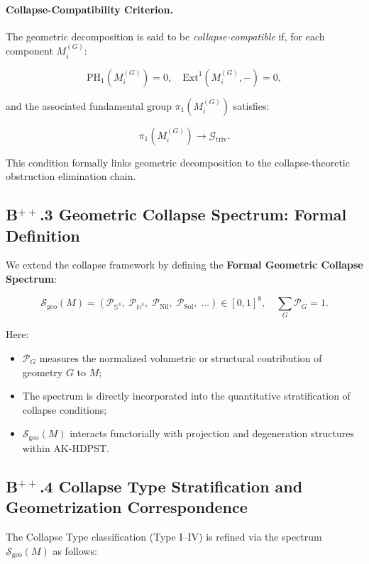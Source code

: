 \documentclass[11pt]{article}
\begin{document}
\paragraph{Collapse-Compatibility Criterion.}  
The geometric decomposition is said to be \emph{collapse-compatible} if, for each component $M_i^{(G)}$:

\[
\mathrm{PH}_1(M_i^{(G)}) = 0,\quad \mathrm{Ext}^1(M_i^{(G)}, -) = 0,
\]

and the associated fundamental group $\pi_1(M_i^{(G)})$ satisfies:

\[
\pi_1(M_i^{(G)}) \longrightarrow \mathcal{G}_{\mathrm{triv}}.
\]

This condition formally links geometric decomposition to the collapse-theoretic obstruction elimination chain.

\subsection*{B$^{++}$.3 Geometric Collapse Spectrum: Formal Definition}

We extend the collapse framework by defining the \textbf{Formal Geometric Collapse Spectrum}:

\[
\mathcal{S}_{\mathrm{geo}}(M) = \left( \mathcal{P}_{\mathbb{S}^3},\; \mathcal{P}_{\mathbb{H}^3},\; \mathcal{P}_{\mathrm{Nil}},\; \mathcal{P}_{\mathrm{Sol}},\; \ldots \right) \in [0,1]^8,\quad \sum_G \mathcal{P}_G = 1.
\]

Here:

\begin{itemize}
    \item $\mathcal{P}_G$ measures the normalized volumetric or structural contribution of geometry $G$ to $M$;
    \item The spectrum is directly incorporated into the quantitative stratification of collapse conditions;
    \item $\mathcal{S}_{\mathrm{geo}}(M)$ interacts functorially with projection and degeneration structures within AK-HDPST.
\end{itemize}

\subsection*{B$^{++}$.4 Collapse Type Stratification and Geometrization Correspondence}

The Collapse Type classification (Type I–IV) is refined via the spectrum $\mathcal{S}_{\mathrm{geo}}(M)$ as follows:
\end{document}
